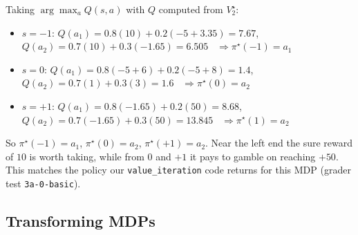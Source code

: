 \begin{solution}
Taking $\arg\max_a Q(s,a)$ with $Q$ computed from $V^\star_2$:
\begin{itemize}[nosep]
  \item $s=-1$: $Q(a_1)=0.8(10)+0.2(-5+3.35)=7.67$, \ $Q(a_2)=0.7(10)+0.3(-1.65)=6.505$ \ $\Rightarrow\pi^\star(-1)=a_1$
  \item $s=0$: $Q(a_1)=0.8(-5+6)+0.2(-5+8)=1.4$, \ $Q(a_2)=0.7(1)+0.3(3)=1.6$ \ $\Rightarrow\pi^\star(0)=a_2$
  \item $s=+1$: $Q(a_1)=0.8(-1.65)+0.2(50)=8.68$, \ $Q(a_2)=0.7(-1.65)+0.3(50)=13.845$ \ $\Rightarrow\pi^\star(1)=a_2$
\end{itemize}
So $\pi^\star(-1)=a_1$, $\pi^\star(0)=a_2$, $\pi^\star(+1)=a_2$. Near the left end the sure reward of $10$ is worth
taking, while from $0$ and $+1$ it pays to gamble on reaching $+50$. This matches the policy our
\texttt{value\_iteration} code returns for this MDP (grader test \texttt{3a-0-basic}).
\end{solution}

\subsection{Transforming MDPs}

